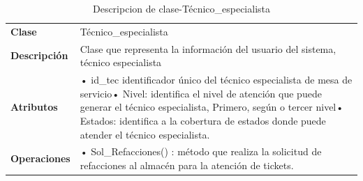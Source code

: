 \begin{table}[H]
	\centering
	\caption{Descripcion de clase-Técnico\_especialista}
	\begin{tabular}{|p{6.145em}|p{28.07em}|}
		\toprule
		\rowcolor[rgb]{ .125,  .216,  .392} \multicolumn{2}{|p{34.215em}|}{\textcolor[rgb]{ 1,  1,  1}{\textbf{Clase Técnico\_especialista}}} \\
		\midrule
		\textbf{Clase} & \multicolumn{1}{l|}{Técnico\_especialista} \\
		\midrule
		\textbf{Descripción} & Clase que representa la información del usuario del sistema, técnico especialista  \\
		\midrule
		\textbf{Atributos } & •	id\_tec identificador único del técnico especialista de mesa de servicio\newline{}•	Nivel: identifica el nivel de atención que puede generar el técnico especialista, Primero, según o tercer nivel\newline{}•	Estados:  identifica a la cobertura de estados donde puede atender el técnico especialista. \\
		\midrule
		\textbf{Operaciones} & •	Sol\_Refacciones()   :  método que realiza la solicitud de refacciones al almacén para la atención de tickets. \\
		\bottomrule
	\end{tabular}%
	\label{tab:clas6}%
\end{table}%



